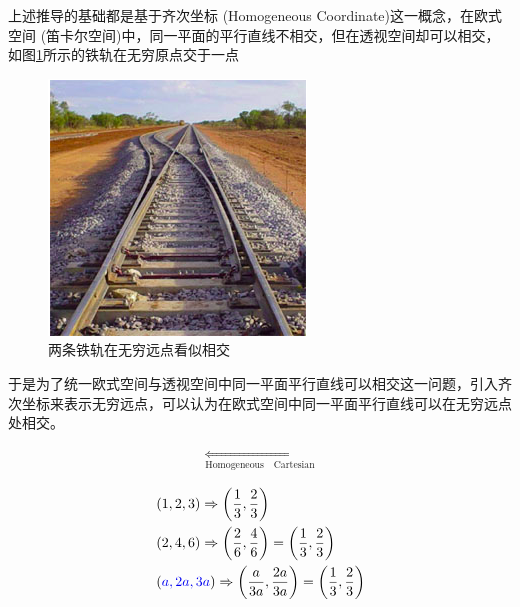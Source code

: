 \documentclass{article}
\begin{document}
上述推导的基础都是基于齐次坐标 (Homogeneous Coordinate)这一概念，在欧式空间 (笛卡尔空间)中，同一平面的平行直线不相交，但在透视空间却可以相交，如图\ref{平行线相交}所示的铁轨在无穷原点交于一点
\begin{figure}
\begin{center}
	\includegraphics[scale=0.5]{平行线相交}
	\caption{两条铁轨在无穷远点看似相交}
	\label{平行线相交}
\end{center}
\end{figure}

于是为了统一欧式空间与透视空间中同一平面平行直线可以相交这一问题，引入齐次坐标来表示无穷远点，可以认为在欧式空间中同一平面平行直线可以在无穷远点处相交。


\begin{tcolorbox}[title=\textbf{使用 N+1 维坐标来代替 N 维坐标},colback=SeaGreen!10!CornflowerBlue!10,colframe=RoyalPurple!55!Aquamarine!100!]
\begin{equation*}
	\begin{aligned}
		\mathop {\left( x,y,w \right) \Longleftrightarrow \left( \frac{x}{w},\frac{y}{w} \right)} \limits_{\mathrm{Homogeneous}    \quad        \mathrm{Cartesian}}			
	\end{aligned}
\end{equation*}
\end{tcolorbox}



\begin{tcolorbox}[title=\textbf{为什么叫齐次性？\footnote{表示二维平面的无穷远点$\left( x,y,0 \right) \Longleftrightarrow \left( \infty ,\infty \right) $}},colback=SeaGreen!10!CornflowerBlue!10,colframe=RoyalPurple!55!Aquamarine!100!]
	\begin{equation*}
		\begin{aligned}
			&	\left( 1,2,3 \right) \Rightarrow \left( \frac{1}{3},\frac{2}{3} \right) 
			\\
			&	\left( 2,4,6 \right) \Rightarrow \left( \frac{2}{6},\frac{4}{6} \right) =\left( \frac{1}{3},\frac{2}{3} \right) 
			\\
			&	\left( {\color[RGB]{0, 0, 240} a,2a,3a} \right) \Rightarrow \left( \frac{a}{3a},\frac{2a}{3a} \right) =\left( \frac{1}{3},\frac{2}{3} \right) 
		\end{aligned}	
	\end{equation*}
\end{tcolorbox}
\end{document}
